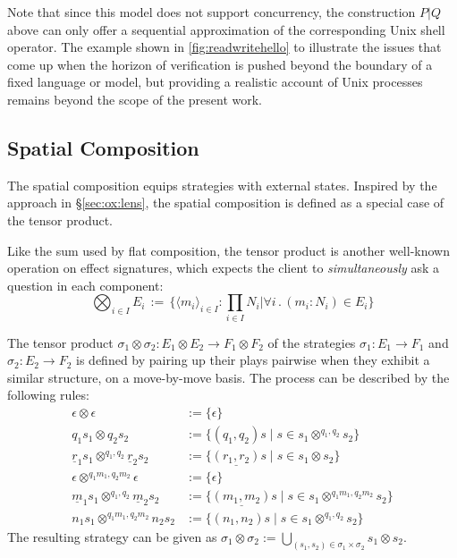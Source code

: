 Note that since this model does not support concurrency,
the construction $P \mathbin{\texttt{|}} Q$ above
can only offer a sequential approximation of
the corresponding Unix shell operator.
The example shown in
\autoref{fig:readwritehello}
to illustrate the issues that come up
when the horizon of verification
is pushed beyond the boundary of a fixed language or model,
but providing a realistic account of Unix processes
remains beyond the scope of the present work.

\subsection{Spatial Composition}

The spatial composition equips strategies
with external states.
Inspired by the approach in \S\ref{sec:ox:lens},
the spatial composition is defined
as a special case of the tensor product.

Like the sum used by flat composition,
the tensor product is another well-known operation on effect signatures,
which expects the client to
\emph{simultaneously} ask a question in each component:
\[
  \bigotimes_{i \in I} E_i \, := \,
  \textstyle
  \big\{ \langle m_i \rangle_{i\in I} : \prod_{i \in I} N_i \mathrel{\big|}
  \forall i \mathbin. (m_i \mathbin: N_i) \in E_i \big\}
\]

\begin{definition}
  The tensor product
  $\sigma_1 \otimes \sigma_2 : E_1 \otimes E_2 \rightarrow F_1 \otimes F_2$
  of the strategies
  $\sigma_1 : E_1 \rightarrow F_1$ and
  $\sigma_2 : E_2 \rightarrow F_2$
  is defined by pairing up their plays pairwise
  when they exhibit a similar structure, on a move-by-move basis.
  The process can be described by the following rules:
  \begin{align*}
    \epsilon \otimes \epsilon & := \{ \epsilon \} \\
    q_1 s_1 \otimes q_2 s_2 & := \{ (q_1, q_2) s \mid s \in s_1 \otimes^{q_1, q_2} s_2 \}\\
    \underline{r}_1 s_1 \otimes^{q_1,q_2} \underline{r}_2 s_2 & := \{ \underline{(r_1, r_2)} s \mid s \in s_1 \otimes s_2 \} \\
    \epsilon \otimes^{q_1m_1,q_2m_2} \epsilon & := \{ \epsilon \} \\
    \underline{m}_1 s_1 \otimes^{q_1,q_2} \underline{m}_2 s_2 & := \{ \underline{(m_1, m_2)} s \mid s \in s_1 \otimes^{q_1m_1, q_2m_2} s_2 \} \\
    n_1s_1 \otimes^{q_1m_1,q_2m_2} n_2s_2 & := \{ (n_1, n_2) s \mid s \in s_1 \otimes^{q_1, q_2} s_2 \}
  \end{align*}
  The resulting strategy can be given as
  $\sigma_1 \otimes \sigma_2 :=
  \bigcup_{(s_1, s_2) \in \sigma_1 \times \sigma_2} s_1 \otimes s_2$.
\end{definition}

